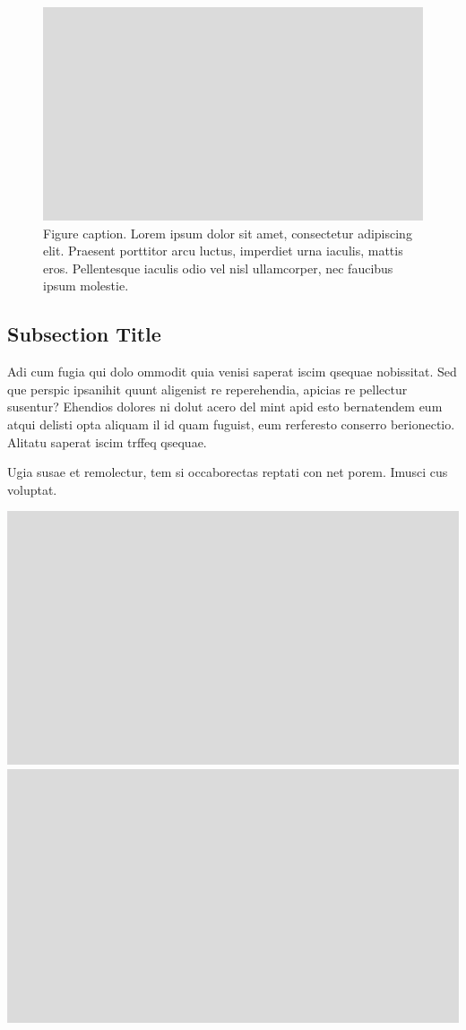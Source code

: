 \documentclass[
	landscape,       %
]{ImperialPoster}
\begin{document}
\begin{multicols}{4}
	\columnbreak{} %
	\begin{figure}[H] %
		\includegraphics[width=\linewidth]{../assets/images/Grey_16-9.pdf} %
		\caption{Figure caption. Lorem ipsum dolor sit amet, consectetur adipiscing elit. Praesent porttitor arcu luctus, imperdiet urna iaculis, mattis eros. Pellentesque iaculis odio vel nisl ullamcorper, nec faucibus ipsum molestie.}
	\end{figure}

	\subsection{Subsection Title}

	Adi cum fugia qui dolo ommodit quia venisi saperat iscim qsequae nobissitat. Sed que perspic ipsanihit quunt aligenist re reperehendia, apicias re pellectur susentur? Ehendios dolores ni dolut acero del mint apid esto bernatendem eum atqui delisti opta aliquam il id quam fuguist, eum rerferesto conserro berionectio. Alitatu saperat iscim  trffeq qsequae.

	Ugia susae et remolectur, tem si occaborectas reptati con net porem. Imusci cus voluptat.

	\includegraphics[width=0.49\linewidth]{../assets/images/Grey_16-9.pdf}\hfill\includegraphics[width=0.49\linewidth]{../assets/images/Grey_16-9.pdf} %


\end{multicols}
\end{document}
